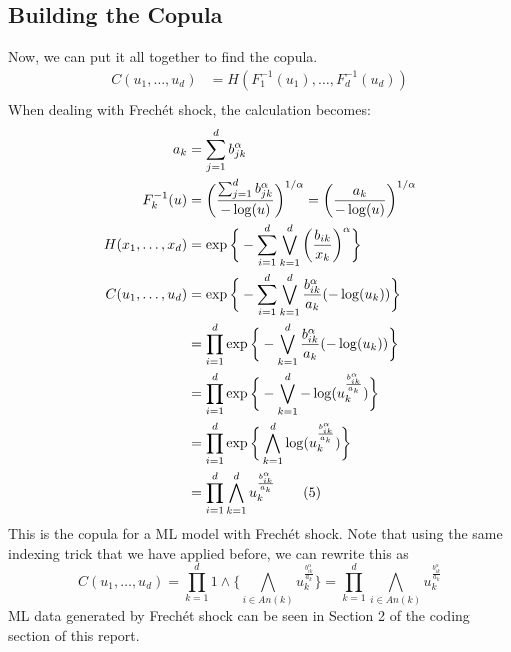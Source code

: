\documentclass[12pt]{article}
\def\inv{^{-1}}
\newcommand{\ds}{\displaystyle}
\theoremstyle{definition}
\theoremstyle{definition}
\begin{document}
\subsection{Building the Copula}
Now, we can put it all together to find the copula.
\begin{align*}
    C(u_1,\hdots, u_d)&=H(F_1\inv(u_1),\hdots, F_d\inv(u_d))\\
\end{align*}
When dealing with Frechét shock, the calculation becomes:
\begin{align*}
a_k&=\sum_{j=1}^d{b_{jk}^\alpha}\\
F_{k}\inv(u)&=\bigg(\frac{\sum_{j=1}^d{b_{jk}^\alpha}}{-\log(u)} \bigg)^{{1}/{\alpha}}=\bigg(\frac{a_k}{- \log(u)}\bigg)^{1/\alpha}\\
H(x_1,\hdots,x_d)&=\exp\bigg\{ -\sum_{i=1}^d \bigvee_{k=1}^d \bigg( \frac{b_{ik}}{x_k} \bigg)^\alpha \bigg\}\\
     C(u_1,\hdots, u_d)&=\exp\bigg\{ -\sum_{i=1}^d \bigvee_{k=1}^d \frac{b_{ik}^\alpha}{a_k}(-\log(u_k))\bigg\}\\
     &=\prod_{i=1}^d\exp\bigg\{- \bigvee_{k=1}^d \frac{b_{ik}^\alpha}{a_k}(-\log(u_k))\bigg\}\\
     &=\prod_{i=1}^d\exp\bigg\{- \bigvee_{k=1}^d -\log(u_k^\frac{b_{ik}^\alpha}{a_k})\bigg\}\\
     &=\prod_{i=1}^d\exp\bigg\{ \bigwedge_{k=1}^d \log(u_k^\frac{b_{ik}^\alpha}{a_k})\bigg\}\\
     \ds&=\prod_{i=1}^d \bigwedge_{k=1}^d u_k^\frac{b_{ik}^\alpha}{a_k}\tag{5}
\end{align*}
This is the copula for a ML model with Frechét shock. Note that using the same indexing trick that we have applied before, we can rewrite this as
$$C(u_1,\hdots,u_d)=\prod_{k=1}^d 1\wedge\bigg\{ \bigwedge_{i\in An(k)} u_k^\frac{b_{ik}^\alpha}{a_k}\bigg\}=\prod_{k=1}^d  \bigwedge_{i\in An(k)} u_k^\frac{b_{ik}^\alpha}{a_k}$$
ML data generated by Frechét shock can be seen in Section 2 of the coding section of this report.
\pagebreak
\end{document}

